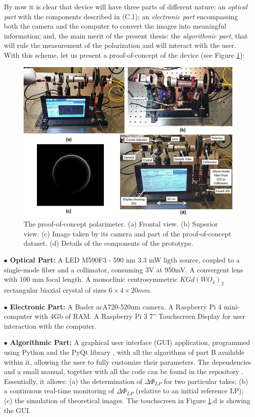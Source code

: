 \documentclass[11pt, a4paper, twoside]{article} %
\begin{document}
By now it is clear that device will have three parts of different nature: an {\em optical part} with the components described in (C.1); an {\em electronic part} encompassing both the camera and the computer to convert the images into meaningful information; and, the main merit of the present thesis: the {\em algorithmic part}, that will rule the measurement of the polarization and will interact with the user. With this scheme, let us present a proof-of-concept of the device (see Figure \ref{fig:proof}):
\begin{figure}[h!] 
     \centering 

    \includegraphics[width=0.87\linewidth]{demo.jpg}
\caption{The proof-of-concept polarimeter. (a) Frontal view. (b) Superior view. (c) Image taken by its camera and part of the proof-of-concept dataset. (d) Details of the components of the prototype.}
        \label{fig:proof}\vspace{-0.4cm}
\end{figure}

{\bf $\bullet$ Optical Part:} A LED M590F3 - 590 nm 3.3 mW ligth source, coupled to a single-mode fiber and a collimator, consuming 3V at 950mV. A convergent lens with 100 mm focal length. A monoclinic centrosymmetric $KGd(WO_4)_2$ rectangular biaxial crystal of sizes $6\times4\times20mm$.\vspace{-0.1cm}


{\bf $\bullet$ Electronic Part:} A Basler acA720-520um camera. A Raspberry Pi 4 mini-computer with 4Gb of RAM. A Raspberry Pi 3 7'' Touchscreen Display for user interaction with the computer.


{\bf $\bullet$ Algorithmic Part:} A graphical user interface (GUI) application, programmed using Python and the PyQt library \cite{pyqt}, with all the algorithms of part B available within it, allowing the user to fully customize their parameters. The dependencies and a small manual, together with all the code can be found in the repository \cite{github}. Essentially, it allows: (a) the determination of $\Delta \Phi_{LP}$ for two particular takes; (b) a continuous real-time monitoring of $\Delta\Phi_{LP}$ (relative to an initial reference LP); (c) the simulation of theoretical images. The touchscreen in Figure \ref{fig:proof}.d is showing the GUI.
\end{document}
